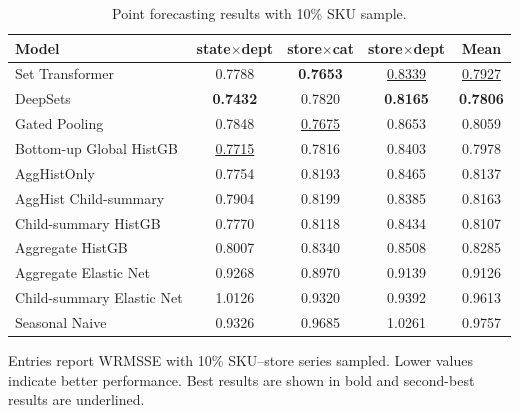 \documentclass[12pt]{article}
\begin{document}
\begin{table}[H]
  \centering
  \caption{Point forecasting results with 10\% SKU sample.}
  \label{tab:appendix_point_10pct}
  \begin{threeparttable}
    \begin{tabular}{lcccc}
      \toprule
      Model                     & state$\times$dept  & store$\times$cat   & store$\times$dept  & Mean               \\
      \midrule
      Set Transformer                & 0.7788             & \textbf{0.7653}    & \underline{0.8339} & \underline{0.7927} \\
      DeepSets                       & \textbf{0.7432}    & 0.7820             & \textbf{0.8165}    & \textbf{0.7806}    \\
      Gated Pooling                  & 0.7848             & \underline{0.7675} & 0.8653             & 0.8059             \\
      Bottom-up Global HistGB        & \underline{0.7715} & 0.7816             & 0.8403             & 0.7978             \\
      AggHistOnly                    & 0.7754             & 0.8193             & 0.8465             & 0.8137             \\
      AggHist Child-summary          & 0.7904             & 0.8199             & 0.8385             & 0.8163             \\
      Child-summary HistGB           & 0.7770             & 0.8118             & 0.8434             & 0.8107             \\
      Aggregate HistGB               & 0.8007             & 0.8340             & 0.8508             & 0.8285             \\
      Aggregate Elastic Net          & 0.9268             & 0.8970             & 0.9139             & 0.9126             \\
      Child-summary Elastic Net      & 1.0126             & 0.9320             & 0.9392             & 0.9613             \\
      Seasonal Naive                 & 0.9326             & 0.9685             & 1.0261             & 0.9757             \\
      \bottomrule
    \end{tabular}
    \begin{tablenotes}
      \footnotesize \item Entries report WRMSSE with 10\% SKU--store series sampled. Lower values indicate better performance. Best results are shown in bold and second-best results are underlined.
    \end{tablenotes}
  \end{threeparttable}
\end{table}
\end{document}
